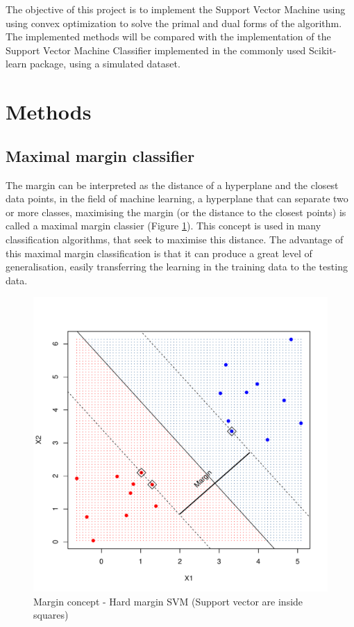 \documentclass[11pt,twocolumn,letterpaper]{article}
\begin{document}
The objective of this project is to implement the Support Vector Machine using using convex optimization to solve the primal and dual forms of the algorithm. The implemented methods will be compared with the implementation of the Support Vector Machine Classifier implemented in the commonly used Scikit-learn package, using a simulated dataset.



\section{Methods}

\subsection{Maximal margin classifier}

The margin can be interpreted as the distance of a hyperplane and the closest data points, in the field of machine learning, a hyperplane that can separate two or more classes, maximising the margin (or the distance to the closest points) is called a maximal margin classier (Figure \ref{fig:margin}). This concept is used in many classification algorithms, that seek to maximise this distance. The advantage of this maximal margin classification is that it can produce a great level of generalisation, easily transferring the learning in the training data to the testing data.

\begin{figure}[h]
	\begin{center}
		\includegraphics[width=1.0\linewidth]{margin.pdf}
	\end{center}
	\caption{Margin concept - Hard margin SVM (Support vector are inside squares)}
	\label{fig:margin}
\end{figure}
\end{document}
